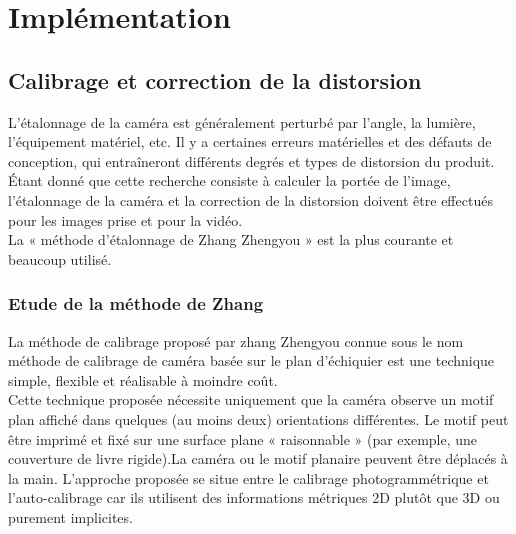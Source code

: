 
\chapter{Implémentation} %

\label{Chapter2} %




\section{Calibrage et correction de la distorsion}
   L'étalonnage de la caméra est généralement 
   perturbé par l'angle, la lumière, l'équipement matériel, 
   etc. Il y a certaines erreurs matérielles et des défauts de conception, qui entraîneront différents degrés et types de distorsion du produit.
   Étant donné que cette recherche consiste à calculer la portée de l'image, 
   l'étalonnage de la caméra et la correction de la distorsion 
   doivent être effectués pour les images prise et pour la vidéo.\\
   La « méthode d'étalonnage de Zhang Zhengyou » est la plus courante et beaucoup utilisé.
      
\subsection{Etude de la méthode de Zhang}
   
   La méthode de calibrage proposé par zhang Zhengyou connue sous le nom méthode de calibrage de caméra basée sur le plan d'échiquier est une technique simple, flexible et réalisable à moindre coût.\\ 
   Cette technique proposée nécessite uniquement que la caméra observe un motif plan affiché dans quelques (au moins deux) orientations
   différentes. Le motif peut être imprimé et fixé sur une surface plane « raisonnable » (par exemple, une couverture de livre rigide).La caméra ou le motif planaire peuvent être déplacés à la main. L'approche proposée se situe entre le calibrage photogrammétrique et l'auto-calibrage car ils utilisent des informations métriques 2D plutôt que 3D ou purement implicites. \\
   
